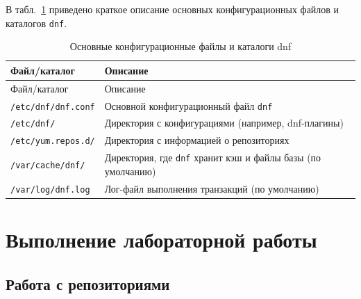 \documentclass[
  english,
  russian,
  12pt,
  a4paper,
  DIV=11,
  numbers=noendperiod]{scrreprt}
\begin{document}
В табл.~\ref{tbl-dnf-files} приведено краткое описание основных
конфигурационных файлов и каталогов \texttt{dnf}.

\begin{longtable}[]{@{}
  >{\raggedright\arraybackslash}p{}
  >{\raggedright\arraybackslash}p{}@{}}
\caption{Основные конфигурационные файлы и каталоги
dnf}\label{tbl-dnf-files}\tabularnewline
\toprule\noalign{}
\begin{minipage}[b]{\linewidth}\raggedright
Файл/каталог
\end{minipage} & \begin{minipage}[b]{\linewidth}\raggedright
Описание
\end{minipage} \\
\midrule\noalign{}
\endfirsthead
\toprule\noalign{}
\begin{minipage}[b]{\linewidth}\raggedright
Файл/каталог
\end{minipage} & \begin{minipage}[b]{\linewidth}\raggedright
Описание
\end{minipage} \\
\midrule\noalign{}
\endhead
\bottomrule\noalign{}
\endlastfoot
\texttt{/etc/dnf/dnf.conf} & Основной конфигурационный файл
\texttt{dnf} \\
\texttt{/etc/dnf/} & Директория с конфигурациями (например,
dnf-плагины) \\
\texttt{/etc/yum.repos.d/} & Директория с информацией о репозиториях \\
\texttt{/var/cache/dnf/} & Директория, где \texttt{dnf} хранит кэш и
файлы базы (по умолчанию) \\
\texttt{/var/log/dnf.log} & Лог-файл выполнения транзакций (по
умолчанию) \\
\end{longtable}

\chapter{Выполнение лабораторной
работы}\label{ux432ux44bux43fux43eux43bux43dux435ux43dux438ux435-ux43bux430ux431ux43eux440ux430ux442ux43eux440ux43dux43eux439-ux440ux430ux431ux43eux442ux44b}

\section{Работа с
репозиториями}\label{ux440ux430ux431ux43eux442ux430-ux441-ux440ux435ux43fux43eux437ux438ux442ux43eux440ux438ux44fux43cux438}
\end{document}
